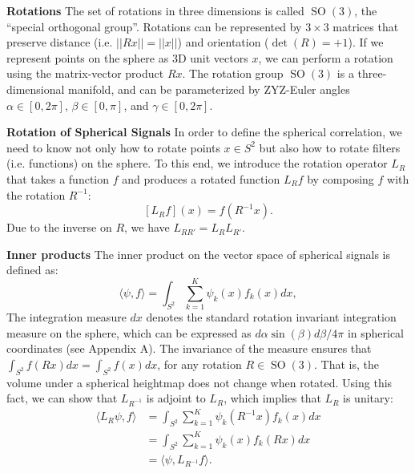 \documentclass{article} %
\newcommand{\SO}[1]{\ensuremath{\operatorname{SO}(#1)}}
\begin{document}
{\bf Rotations}
The set of rotations in three dimensions is called $\SO3$, the ``special orthogonal group''.
Rotations can be represented by $3 \times 3$ matrices that preserve distance (i.e. $||Rx|| = ||x||$) and orientation ($\det(R) = +1$).
If we represent points on the sphere as 3D unit vectors $x$, we can perform a rotation using the matrix-vector product $Rx$.
The rotation group $\SO3$ is a three-dimensional manifold, and can be parameterized by ZYZ-Euler angles $\alpha \in [0, 2\pi]$, $\beta \in [0, \pi]$, and $\gamma \in [0, 2\pi]$. %

{\bf Rotation of Spherical Signals}
In order to define the spherical correlation, we need to know not only how to rotate points $x \in S^2$ but also how to rotate filters (i.e. functions) on the sphere.
To this end, we introduce the rotation operator $L_R$ that takes a function $f$ and produces a rotated function $L_R f$ by composing $f$ with the rotation $R^{-1}$:
\begin{equation}
    \label{eq:L_R_sphere}
  [L_R f](x) =
  f(R^{-1} x).
\end{equation}
Due to the inverse on $R$, we have $L_{RR'} = L_R L_{R'}$.

{\bf Inner products}
The inner product on the vector space of spherical signals is defined as:
\begin{equation}
  \langle \psi, f \rangle = \int_{S^2} \sum_{k=1}^K \psi_k(x) f_k(x) dx,
\end{equation}
The integration measure $dx$ denotes the standard rotation invariant integration measure on the sphere, which can be expressed as $d\alpha \sin(\beta) d\beta / 4\pi$ in spherical coordinates (see Appendix A).
The invariance of the measure ensures that $\int_{S^2} f(R x) dx = \int_{S^2} f(x) dx$, for any rotation $R \in \SO3$.
That is, the volume under a spherical heightmap does not change when rotated.
Using this fact, we can show that $L_{R^{-1}}$ is adjoint to $L_R$, which implies that $L_R$ is unitary:
\begin{equation}
  \begin{aligned}
    \langle L_R \psi, f \rangle
     &= \int_{S^2} \sum_{k=1}^K \psi_k(R^{-1} x) f_k(x) dx \\
     &= \int_{S^2} \sum_{k=1}^K \psi_k(x) f_k(R x) dx \\
     &= \langle \psi, L_{R^{-1}} f \rangle.
  \end{aligned}
\end{equation}
\end{document}
